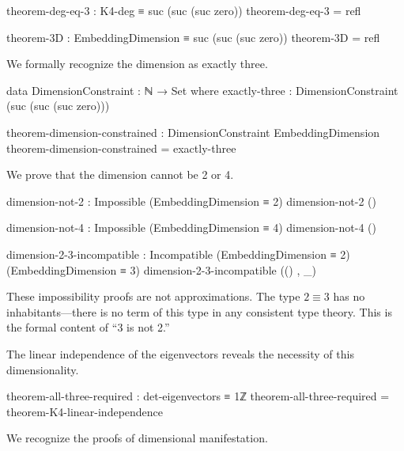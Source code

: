 \documentclass[11pt,a4paper]{book}
\begin{document}
\begin{code}
theorem-deg-eq-3 : K4-deg ≡ suc (suc (suc zero))
theorem-deg-eq-3 = refl

theorem-3D : EmbeddingDimension ≡ suc (suc (suc zero))
theorem-3D = refl

\end{code}

We formally recognize the dimension as exactly three.

\begin{code}
data DimensionConstraint : ℕ → Set where
  exactly-three : DimensionConstraint (suc (suc (suc zero)))

theorem-dimension-constrained : DimensionConstraint EmbeddingDimension
theorem-dimension-constrained = exactly-three

\end{code}

We prove that the dimension cannot be 2 or 4.

\begin{code}
dimension-not-2 : Impossible (EmbeddingDimension ≡ 2)
dimension-not-2 ()

dimension-not-4 : Impossible (EmbeddingDimension ≡ 4)
dimension-not-4 ()

\end{code}

\begin{code}
dimension-2-3-incompatible : Incompatible (EmbeddingDimension ≡ 2) (EmbeddingDimension ≡ 3)
dimension-2-3-incompatible (() , _)

\end{code}

These impossibility proofs are not approximations. The type $2 \equiv 3$ has no inhabitants---there is no term of this type in any consistent type theory. This is the formal content of ``3 is not 2.''

The linear independence of the eigenvectors reveals the necessity of this dimensionality.

\begin{code}
theorem-all-three-required : det-eigenvectors ≡ 1ℤ
theorem-all-three-required = theorem-K4-linear-independence

\end{code}

We recognize the proofs of dimensional manifestation.
\end{document}
